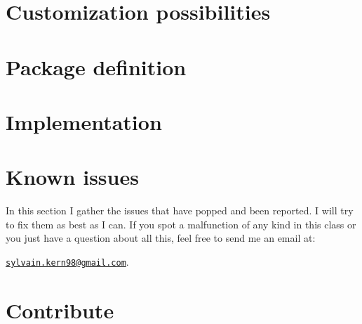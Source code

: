 \documentclass[raggedright, twoside, 11pt]{tufte-style-article}
\begin{document}
\section{Customization possibilities}


\section{Package definition}


\section{Implementation}


\section{Known issues}
\label{sec:known-issues}

In this section I gather the issues that have popped and been reported. I will try to fix them as best as I can. If you spot a malfunction of any kind in this class or you just have a question about all this, feel free to send me an email at:

\href{mailto:sylvain.kern98@gmail.com}{\texttt{sylvain.kern98@gmail.com}}.

\iffalse
\begin{ul}
\tightlist
\end{ul}
\fi
	
\section{Contribute}
\label{sec:contribute}
\end{document}
